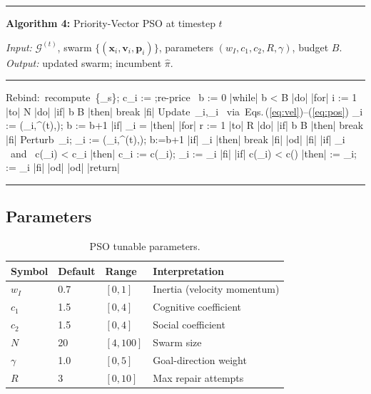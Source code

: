 \documentclass[11pt,a4paper]{article}
\theoremstyle{definition}
\newcommand{\calG}{\mathcal{G}}
\newcommand{\xvec}{\mathbf{x}}
\newcommand{\vvec}{\mathbf{v}}
\newcommand{\pvec}{\mathbf{p}}
\newcommand{\gvec}{\mathbf{g}}
\begin{document}
\begin{center}
\begin{minipage}{0.88\linewidth}
\hrule\medskip
\textbf{Algorithm 4:} Priority-Vector PSO at timestep $t$

\smallskip\textit{Input:} $\calG^{(t)}$, swarm $\{(\xvec_i,\vvec_i,\pvec_i)\}$,
parameters $(w_I,c_1,c_2,R,\gamma)$, budget $B$.
\textit{Output:} updated swarm; incumbent $\hat\pi$.
\hrule\medskip
\begin{program}
\mbox{Rebind: recompute }\{\eta_s\};\; c_i := \infty;\;\mbox{re-price }\hat\pi
b := 0
|while| b < B |do|
  |for| i := 1 |to| N |do|
    |if| b \ge B |then| \mbox{break} |fi|
    \mbox{Update }\vvec_i,\xvec_i \mbox{ via Eqs.\,(\ref{eq:vel})--(\ref{eq:pos})}
    \pi_i := (\xvec_i,\calG^{(t)},\eta);\; b := b+1
    |if| \pi_i =  |then|
      |for| r := 1 |to| R |do|
        |if| b \ge B |then| \mbox{break} |fi|
        \mbox{Perturb }\xvec_i;\; \pi_i := (\xvec_i,\calG^{(t)},\eta);\; b:=b+1
        |if| \pi_i \ne {} |then| \mbox{break} |fi|
      |od|
    |fi|
    |if| \pi_i \ne {} \mbox{ and } c(\pi_i) < c_i |then|
      c_i := c(\pi_i);\; \pvec_i := \xvec_i
    |fi|
    |if| c(\pi_i) < c(\hat\pi) |then| \hat\pi := \pi_i;\; \gvec := \xvec_i |fi|
  |od|
|od|
|return| \hat\pi
\end{program}
\hrule
\end{minipage}
\end{center}

\subsection{Parameters}
\begin{table}[h]\centering
  \caption{PSO tunable parameters.}
  \begin{tabular}{lllp{5cm}}
    \toprule Symbol & Default & Range & Interpretation \\ \midrule
    $w_I$ & 0.7 & $[0,1]$ & Inertia (velocity momentum) \\
    $c_1$ & 1.5 & $[0,4]$ & Cognitive coefficient \\
    $c_2$ & 1.5 & $[0,4]$ & Social coefficient \\
    $N$   & 20  & $[4,100]$ & Swarm size \\
    $\gamma$ & 1.0 & $[0,5]$ & Goal-direction weight \\
    $R$   & 3   & $[0,10]$ & Max repair attempts \\
    \bottomrule
  \end{tabular}
\end{table}
\end{document}
